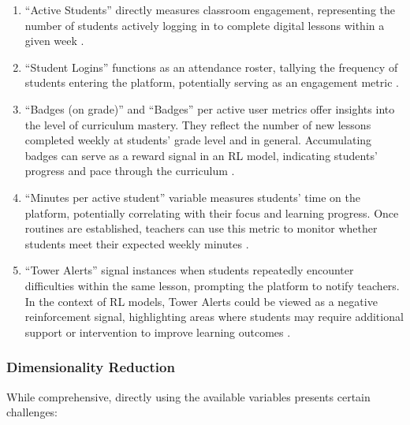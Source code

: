 \documentclass[
  number,
  preprint,
  3p,
  onecolumn]{elsarticle}
\begin{document}
\begin{enumerate}
\def\labelenumi{\arabic{enumi}.}
\item
  ``Active Students'' directly measures classroom engagement,
  representing the number of students actively logging in to complete
  digital lessons within a given week \citep{zearn2022}.
\item
  ``Student Logins'' functions as an attendance roster, tallying the
  frequency of students entering the platform, potentially serving as an
  engagement metric \citep{zearnaf}.
\item
  ``Badges (on grade)'' and ``Badges'' per active user metrics offer
  insights into the level of curriculum mastery. They reflect the number
  of new lessons completed weekly at students' grade level and in
  general. Accumulating badges can serve as a reward signal in an RL
  model, indicating students' progress and pace through the curriculum
  \citep{zearnae}.
\item
  ``Minutes per active student'' variable measures students' time on the
  platform, potentially correlating with their focus and learning
  progress. Once routines are established, teachers can use this metric
  to monitor whether students meet their expected weekly minutes
  \citep{zearn2022}.
\item
  ``Tower Alerts'' signal instances when students repeatedly encounter
  difficulties within the same lesson, prompting the platform to notify
  teachers. In the context of RL models, Tower Alerts could be viewed as
  a negative reinforcement signal, highlighting areas where students may
  require additional support or intervention to improve learning
  outcomes \citep{zearnad}.
\end{enumerate}

\subsubsection{Dimensionality Reduction}\label{dimensionality-reduction}

While comprehensive, directly using the available variables presents
certain challenges:
\end{document}
